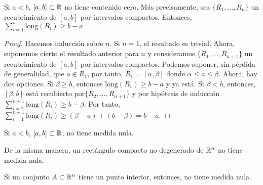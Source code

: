 \begin{lema}
	Si $a < b$, $[a,b] \subset \mathbb{R}$ no tiene contenido cero. Más precisamente,
	sea $\{R_1,\dots,R_n\}$ un recubrimiento de $[a,b]$ por intervalos compactos.
	Entonces, $\sum\limits^{n}_{i=1} \text{long}(R_i) \geq b-a$
\end{lema}
\begin{proof}
	Hacemos inducción sobre $n$. Si $n = 1$, el resultado es trivial. Ahora,
	suponemos cierto el resultado anterior para $n$ y consideramos
	$\{R_1,\dots,R_{n+1}\}$ un recubrimiento de $[a,b]$ por intervalos compactos.
	Podemos suponer, sin p\'erdida de generalidad, que $a \in R_1$, por tanto,
	$R_1 = [\alpha,\beta]$ donde $\alpha \leq a \leq \beta$. Ahora, hay dos
	opciones. Si $\beta \geq b$, entonces $\text{long}(R_1) \geq b - a$ y ya está.
	Si $\beta< b$, entonces, $[\beta,b]$ está recubierto por$\{R_2,\dots,R_{n+1}\}$
	y por hipótesis de inducción $\sum\limits^{n+1}_{i=2} \text{long}(R_i) \geq
	b - \beta$. Por tanto, $\sum\limits^{n+1}_{i=1} \text{long}(R_i) \geq
	(\beta - a) + (b - \beta) = b - a$.
\end{proof}
\begin{col*}
	Si $a < b$, $[a,b]\subset \mathbb{R}$, no tiene medida nula.
\end{col*}
\begin{obs*}
	De la misma manera, un rectángulo compacto no degenerado de $\mathbb{R}^n$ no
	tiene medida nula.
\end{obs*}
\begin{col*}
	Si un conjunto $A \subset \mathbb{R}^n$ tiene un punto interior, entonces, no tiene
	medida nula.
\end{col*}

